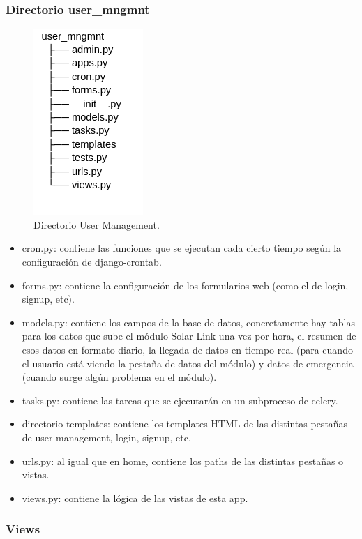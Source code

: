 \subsubsection{Directorio user\_mngmnt}
\begin{figure}[H]
    \centering
    \includegraphics[width=0.25\linewidth]{web/Captura desde 2023-10-16 23-35-42.png}
    \caption{Directorio User Management.}
    \label{fig:dir-user_mngmnt}
\end{figure}
\begin{itemize}
    \item cron.py: contiene las funciones que se ejecutan cada cierto tiempo según la configuración de django-crontab.
    \item forms.py: contiene la configuración de los formularios web (como el de login, signup, etc).
    \item models.py: contiene los campos de la base de datos, concretamente hay tablas para los datos que sube el módulo Solar Link una vez por hora, el resumen de esos datos en formato diario, la llegada de datos en tiempo real (para cuando el usuario está viendo la pestaña de datos del módulo) y datos de emergencia (cuando surge algún problema en el módulo).
    \item tasks.py: contiene las tareas que se ejecutarán en un subproceso de celery.
    \item directorio templates: contiene los templates HTML de las distintas pestañas de user management, login, signup, etc.
    \item urls.py: al igual que en home, contiene los paths de las distintas pestañas o vistas.
    \item views.py: contiene la lógica de las vistas de esta app.
\end{itemize}

\subsubsection{Views}


